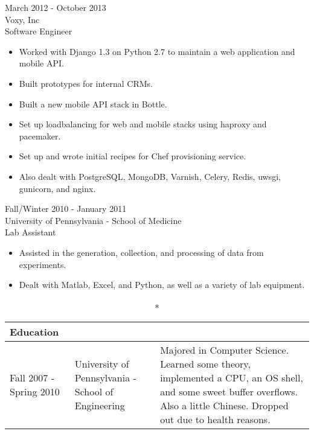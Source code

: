 \documentclass[a4paper]{article}
\begin{document}
    \begin{minipage}[t][4em][c]{0.5 \textwidth}
        \vspace{17em}
        March 2012 - October 2013 \\
        Voxy, Inc \\
        Software Engineer 
        \begin{itemize}
            \item Worked with Django 1.3 on Python 2.7 to maintain a web application and mobile API.
            \item Built prototypes for internal CRMs.
            \item Built a new mobile API stack in Bottle.
            \item Set up loadbalancing for web and mobile stacks using haproxy and pacemaker.
            \item Set up and wrote initial recipes for Chef provisioning service.
            \item Also dealt with PostgreSQL, MongoDB, Varnish, Celery, Redis, uwsgi, gunicorn, and nginx. 
        \end{itemize}
    \end{minipage}
    \begin{minipage}[t][4em][c]{0.5 \textwidth}
        \vspace{7em}
        Fall/Winter 2010 - January 2011 \\ 
        University of Pennsylvania - School of Medicine \\
        Lab Assistant \\
        \begin{itemize}
            \item Assisted in the generation, collection, and processing of data from experiments. 
            \item Dealt with Matlab, Excel, and Python, as well as a variety of lab equipment.
        \end{itemize}
    \end{minipage}

    \vspace{.2in}

    \begin{longtable}{ m{3cm} m{6.45cm} m{8cm} }
        \caption*{Education}\\
        \hline
        Fall 2007 - \newline Spring 2010 & University of \newline Pennsylvania - \newline School of Engineering & Majored in Computer Science. Learned some theory, implemented a CPU, an OS shell, and some sweet buffer overflows. Also a little Chinese. Dropped out due to health reasons. \\
    \end{longtable}
    
\end{document}
